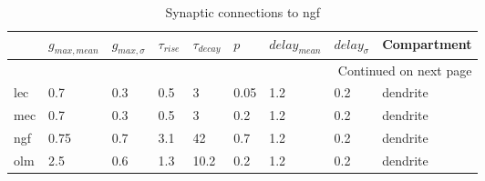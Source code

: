 \begin{longtable}{lllllllll}
\caption{Synaptic connections to ngf}\label{ngf_synapses}\\
\toprule
{} &  $g_{max, mean}$ & $g_{max, \sigma}$ & $\tau_{rise}$ & $\tau_{decay}$ &  $p$ & $delay_{mean}$ & $delay_{\sigma}$ & Compartment \\
\midrule
\endhead
\midrule
\multicolumn{9}{r}{{Continued on next page}} \\
\midrule
\endfoot

\bottomrule
\endlastfoot
lec &   0.7 &      0.3 &      0.5 &         3 &  0.05 &   1.2 &       0.2 &      dendrite\ \\
mec &   0.7 &      0.3 &      0.5 &         3 &   0.2 &   1.2 &       0.2 &      dendrite\ \\
ngf &  0.75 &      0.7 &      3.1 &        42 &   0.7 &   1.2 &       0.2 &      dendrite\ \\
olm &   2.5 &      0.6 &      1.3 &      10.2 &   0.2 &   1.2 &       0.2 &      dendrite\ \\
\end{longtable}
